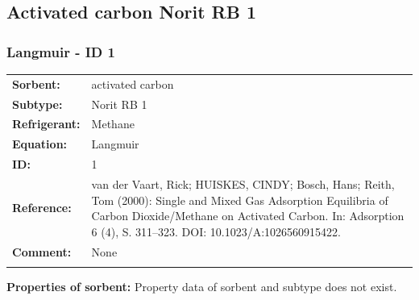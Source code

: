 \subsection{Activated carbon Norit RB 1}
%
\subsubsection{Langmuir - ID 1}
%
\begin{tabular}[l]{|lp{11.5cm}|}
\hline
\addlinespace

\textbf{Sorbent:} & activated carbon \\
\textbf{Subtype:} & Norit RB 1 \\
\textbf{Refrigerant:} & Methane \\
\textbf{Equation:} & Langmuir \\
\textbf{ID:} & 1 \\
\textbf{Reference:} & van der Vaart, Rick; HUISKES, CINDY; Bosch, Hans; Reith, Tom (2000): Single and Mixed Gas Adsorption Equilibria of Carbon Dioxide/Methane on Activated Carbon. In: Adsorption 6 (4), S. 311–323. DOI: 10.1023/A:1026560915422. \\
\textbf{Comment:} & None \\

\addlinespace
\hline
\end{tabular}
\newline

\textbf{Properties of sorbent:}
\newline
%
Property data of sorbent and subtype does not exist.

